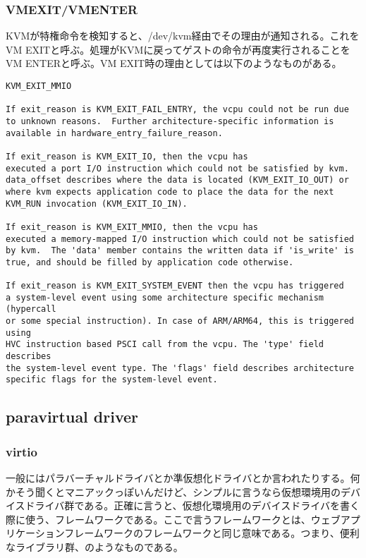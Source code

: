 \documentclass[9pt,b5paper,tombo]{jsbook}
\begin{document}
\subsubsection{VMEXIT/VMENTER}

KVMが特権命令を検知すると、/dev/kvm経由でその理由が通知される。これをVM EXITと呼ぶ。処理がKVMに戻ってゲストの命令が再度実行されることをVM ENTERと呼ぶ。VM EXIT時の理由としては以下のようなものがある。

\begin{lstlisting}
KVM_EXIT_MMIO

If exit_reason is KVM_EXIT_FAIL_ENTRY, the vcpu could not be run due
to unknown reasons.  Further architecture-specific information is
available in hardware_entry_failure_reason.

If exit_reason is KVM_EXIT_IO, then the vcpu has
executed a port I/O instruction which could not be satisfied by kvm.
data_offset describes where the data is located (KVM_EXIT_IO_OUT) or
where kvm expects application code to place the data for the next
KVM_RUN invocation (KVM_EXIT_IO_IN).

If exit_reason is KVM_EXIT_MMIO, then the vcpu has
executed a memory-mapped I/O instruction which could not be satisfied
by kvm.  The 'data' member contains the written data if 'is_write' is
true, and should be filled by application code otherwise.

If exit_reason is KVM_EXIT_SYSTEM_EVENT then the vcpu has triggered
a system-level event using some architecture specific mechanism (hypercall
or some special instruction). In case of ARM/ARM64, this is triggered using
HVC instruction based PSCI call from the vcpu. The 'type' field describes
the system-level event type. The 'flags' field describes architecture
specific flags for the system-level event.
\end{lstlisting}

\subsection{paravirtual driver}

\subsubsection{virtio}

一般にはパラバーチャルドライバとか準仮想化ドライバとか言われたりする。何かそう聞くとマニアックっぽいんだけど、シンプルに言うなら仮想環境用のデバイスドライバ群である。正確に言うと、仮想化環境用のデバイスドライバを書く際に使う、フレームワークである。ここで言うフレームワークとは、ウェブアプリケーションフレームワークのフレームワークと同じ意味である。つまり、便利なライブラリ群、のようなものである。
\end{document}
